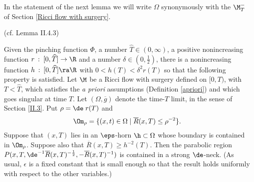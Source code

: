 In the statement of the
next lemma we will write $\Omega$
synonymously with the $\M_T^-$ of Section
\ref{Ricci flow with surgery}.

\begin{lemma}
  \label{lem:kl-necks-horns-existence-ricci-flow-surgery}
(cf. Lemma II.4.3) \label{lemmaII.4.3}
\label{hexists}

Given the pinching function $\Phi$, a number
$\widehat{T} \in (0, \infty)$, a positive nonincreasing
function $r \: : \: [0, \widehat{T}] \rightarrow \R$ and a number $\delta \in
\left( 0, \frac12 \right)$,
there is a
nonincreasing
function $h\::\:[0,\widehat{T}]\ra \R$ with
$0 < h(T) < \delta^2 r(T)$
so that the following property is satisfied.
Let
$\M$ be a Ricci flow with surgery defined on $[0, T)$, with $T < \widehat{T}$,
which satisfies the {\it a priori}
assumptions (Definition \ref{apriori}) and which goes singular
at time $T$. Let $(\Omega, \overline{g})$ denote the time-$T$ limit, in the sense of
Section \ref{II.3}.
Put $\rho = \de\; r(T)$ and
\begin{equation}
\Om_\rho=\{(x,t)\in \Omega \mid \overline{R}(x,T)\leq \rho^{-2}\}.
\end{equation}
\noindent
Suppose that $(x,T)$
lies in an $\eps$-horn $\h\subset \Omega$ whose boundary is contained in
$\Om_\rho$.
Suppose also that  $\overline{R}(x,T)\geq h^{-2}(T)$.
Then the parabolic
region $P(x,T,\de^{-1}\overline{R}(x,T)^{-\frac12},-\overline{R}(x,T)^{-1})$ is
contained in a strong $\de$-neck. (As usual, $\epsilon$ is
a fixed constant that is small enough so that the result holds
uniformly  with respect to the other variables.)
\end{lemma}
